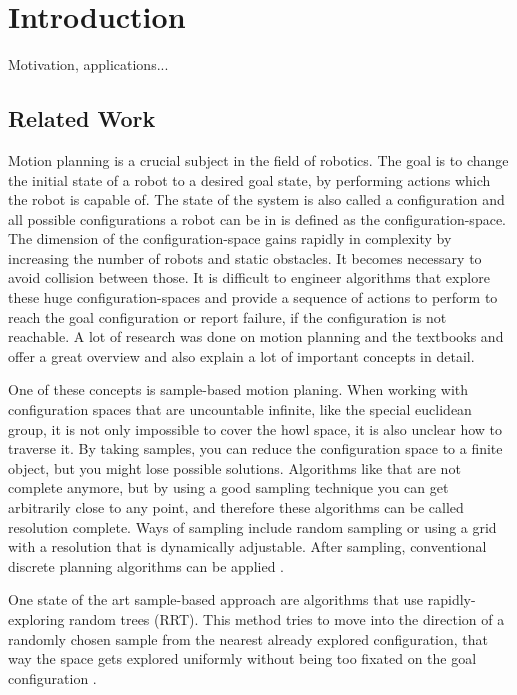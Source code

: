 \chapter{Introduction}

Motivation, applications...

\section{Related Work}

Motion planning is a crucial subject in the field of robotics.
The goal is to change the initial state of a robot to a desired goal state, by performing actions which the robot is capable of.
The state of the system is also called a configuration and all possible configurations a robot can be in is defined as the configuration-space.
The dimension of the configuration-space gains rapidly in complexity by increasing the number of robots and static obstacles.
It becomes necessary to avoid collision between those.
It is difficult to engineer algorithms that explore these huge configuration-spaces and provide a sequence of actions to perform to reach the goal configuration or report failure, if the configuration is not reachable.
A lot of research was done on motion planning and the textbooks \cite{LaValle2006} and \cite{Mueller2019} offer a great overview and also explain a lot of important concepts in detail.

One of these concepts is sample-based motion planing.
When working with configuration spaces that are uncountable infinite, like the special euclidean group, it is not only impossible to cover the howl space, it is also unclear how to traverse it.
By taking samples, you can reduce the configuration space to a finite object, but you might lose possible solutions.
Algorithms like that are not complete anymore, but by using a good sampling technique you can get arbitrarily close to any point, and therefore these algorithms can be called resolution complete.
Ways of sampling include random sampling or using a grid with a resolution that is dynamically adjustable.
After sampling, conventional discrete planning algorithms can be applied \cite{LaValle2006}.

One state of the art sample-based approach are algorithms that use rapidly-exploring random trees (RRT).
This method tries to move into the direction of a randomly chosen sample from the nearest already explored configuration, that way the space gets explored uniformly without being too fixated on the goal configuration \cite{lavalle1998,lavalle2001}.

